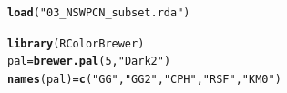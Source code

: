 \documentclass{article}\usepackage[]{graphicx}\usepackage[]{color}
\makeatletter
\newcommand{\hlnum}[1]{\textcolor[rgb]{0.686,0.059,0.569}{#1}}%
\newcommand{\hlstr}[1]{\textcolor[rgb]{0.192,0.494,0.8}{#1}}%
\newcommand{\hlstd}[1]{\textcolor[rgb]{0.345,0.345,0.345}{#1}}%
\newcommand{\hlkwb}[1]{\textcolor[rgb]{0.69,0.353,0.396}{#1}}%
\newcommand{\hlkwd}[1]{\textcolor[rgb]{0.737,0.353,0.396}{\textbf{#1}}}%
\newenvironment{kframe}{%
 \def\at@end@of@kframe{}%
 \ifinner\ifhmode%
  \def\at@end@of@kframe{\end{minipage}}%
  \begin{minipage}{\columnwidth}%
 \fi\fi%
 \def\FrameCommand##1{\hskip\@totalleftmargin \hskip-\fboxsep
 \colorbox{shadecolor}{##1}\hskip-\fboxsep
     \hskip-\linewidth \hskip-\@totalleftmargin \hskip\columnwidth}%
 \MakeFramed {\advance\hsize-\width
   \@totalleftmargin\z@ \linewidth\hsize
   \@setminipage}}%
 {\par\unskip\endMakeFramed%
 \at@end@of@kframe}
\newenvironment{knitrout}{}{} %
\makeatother
\begin{document}
\begin{knitrout}
\begin{kframe}
{\ttfamily\noindent\itshape\color{messagecolor}{\#\# Loading required package: pec\\\#\# Loading required package: mvtnorm\\\#\# Loading required package: timereg}}\begin{alltt}
\hlkwd{load}\hlstd{(}\hlstr{"03_NSWPCN_subset.rda"}\hlstd{)}

\hlkwd{library}\hlstd{(RColorBrewer)}
\hlstd{pal} \hlkwb{=} \hlkwd{brewer.pal}\hlstd{(}\hlnum{5}\hlstd{,} \hlstr{"Dark2"}\hlstd{)}
\hlkwd{names}\hlstd{(pal)} \hlkwb{=} \hlkwd{c}\hlstd{(}\hlstr{"GG"}\hlstd{,} \hlstr{"GG2"}\hlstd{,} \hlstr{"CPH"}\hlstd{,} \hlstr{"RSF"}\hlstd{,} \hlstr{"KM0"}\hlstd{)}
\end{alltt}
\end{kframe}
\end{knitrout}


\end{document}
